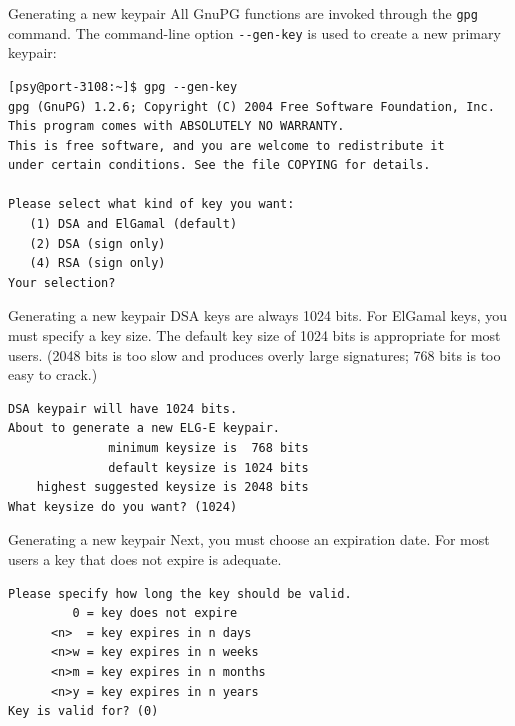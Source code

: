 \documentclass[%
mode=present,%
paper=screen%
]{powerdot}
\newcommand{\clopt}[1]{\texttt{{-}#1}}
\begin{document}
\begin{slide}[method=direct]{Generating a new keypair}
  All GnuPG functions are invoked through the \texttt{gpg} command.
  The command-line option \clopt{-gen-key} is used to create a new
  primary keypair:\\[1ex]
\begin{verbatim}
[psy@port-3108:~]$ gpg --gen-key
gpg (GnuPG) 1.2.6; Copyright (C) 2004 Free Software Foundation, Inc.
This program comes with ABSOLUTELY NO WARRANTY.
This is free software, and you are welcome to redistribute it
under certain conditions. See the file COPYING for details.

Please select what kind of key you want:
   (1) DSA and ElGamal (default)
   (2) DSA (sign only)
   (4) RSA (sign only)
Your selection? 
\end{verbatim}
\end{slide}

\begin{slide}[method=direct,toc=]{Generating a new keypair}
  DSA keys are always 1024 bits.  For ElGamal keys, you must specify a
  key size.  The default key size of 1024 bits is appropriate for most
  users. (2048 bits is too slow and produces overly large
  signatures; 768 bits is too easy to crack.)\\[1ex]
\begin{verbatim}
DSA keypair will have 1024 bits.
About to generate a new ELG-E keypair.
              minimum keysize is  768 bits
              default keysize is 1024 bits
    highest suggested keysize is 2048 bits
What keysize do you want? (1024) 
\end{verbatim}
\end{slide}

\begin{slide}[method=direct,toc=]{Generating a new keypair}
  Next, you must choose an expiration date. For most users a key
  that does not expire is adequate.\\[1ex]
\begin{verbatim}
Please specify how long the key should be valid.
         0 = key does not expire
      <n>  = key expires in n days
      <n>w = key expires in n weeks
      <n>m = key expires in n months
      <n>y = key expires in n years
Key is valid for? (0)
\end{verbatim}
\end{slide}
\end{document}
